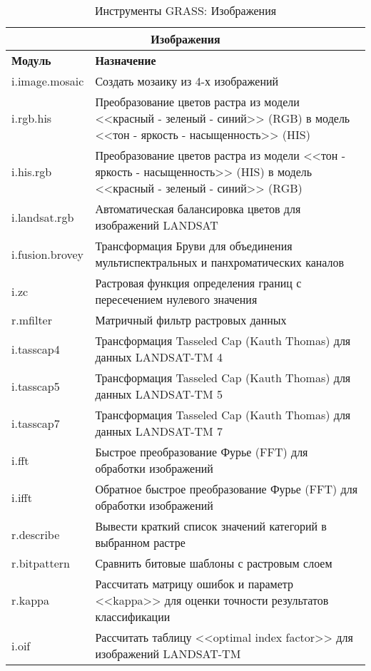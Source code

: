 {\renewcommand{\arraystretch}{0.7}
\begin{table}[H]
\centering
 \begin{tabular}{|p{4cm}|p{10cm}|}
  \hline \multicolumn{2}{|c|}{\textbf{Изображения}} \\
  \hline \textbf{Модуль} & \textbf{Назначение} \\
  \hline i.image.mosaic & Создать мозаику из 4-х изображений \\
  \hline i.rgb.his & Преобразование цветов растра из модели
  <<красный - зеленый - синий>> (RGB) в модель <<тон - яркость - насыщенность>> (HIS) \\
  \hline i.his.rgb & Преобразование цветов растра из модели
  <<тон - яркость - насыщенность>> (HIS) в модель <<красный - зеленый - синий>> (RGB) \\
  \hline i.landsat.rgb & Автоматическая балансировка цветов для
  изображений LANDSAT \\
  \hline i.fusion.brovey & Трансформация Бруви для объединения
  мультиспектральных и панхроматических каналов \\
  \hline i.zc & Растровая функция определения границ с пересечением
  нулевого значения \\
  \hline r.mfilter &  Матричный фильтр растровых данных \\
  \hline i.tasscap4 & Трансформация Tasseled Cap (Kauth Thomas) для
  данных LANDSAT-TM 4 \\
  \hline i.tasscap5 & Трансформация Tasseled Cap (Kauth Thomas) для
  данных LANDSAT-TM 5 \\
  \hline i.tasscap7 & Трансформация Tasseled Cap (Kauth Thomas) для
  данных LANDSAT-TM 7 \\
  \hline i.fft & Быстрое преобразование Фурье (FFT) для обработки
  изображений \\
  \hline i.ifft & Обратное быстрое преобразование Фурье (FFT) для обработки
  изображений \\
  \hline r.describe & Вывести краткий список значений категорий в
  выбранном растре \\
  \hline r.bitpattern & Сравнить битовые шаблоны с растровым слоем \\
  \hline r.kappa & Рассчитать матрицу ошибок и параметр <<kappa>> для
  оценки точности результатов классификации \\
  \hline i.oif & Рассчитать таблицу <<optimal index factor>> для
  изображений LANDSAT-TM \\
\hline
\end{tabular}
\caption{Инструменты GRASS: Изображения}
\end{table}}

